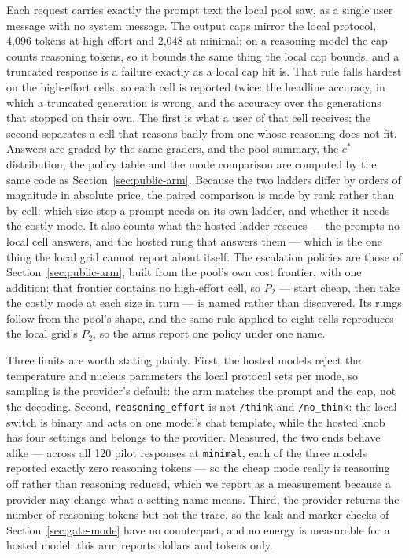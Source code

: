 Each request carries exactly the prompt text the local pool saw, as a single
user message with no system message. The output caps mirror the local
protocol, 4{,}096 tokens at high effort and 2{,}048 at minimal; on a
reasoning model the cap counts reasoning tokens, so it bounds the same thing
the local cap bounds, and a truncated response is a failure exactly as a
local cap hit is. That rule falls hardest on the high-effort cells, so each
cell is reported twice: the headline accuracy, in which a truncated
generation is wrong, and the accuracy over the generations that stopped on
their own. The first is what a user of that cell receives; the second
separates a cell that reasons badly from one whose reasoning does not fit.
Answers are graded by the same graders, and the pool summary, the $c^*$
distribution, the policy table and the mode comparison are computed by the
same code as Section~\ref{sec:public-arm}. Because the two ladders differ by
orders of magnitude in absolute price, the paired comparison is made by rank
rather than by cell: which size step a prompt needs on its own ladder, and
whether it needs the costly mode. It also counts what the hosted ladder
rescues --- the prompts no local cell answers, and the hosted rung that
answers them --- which is the one thing the local grid cannot report about
itself.
The escalation policies are those of Section~\ref{sec:public-arm}, built
from the pool's own cost frontier, with one addition: that frontier contains
no high-effort cell, so $P_2$ --- start cheap, then take the costly mode at
each size in turn --- is named rather than discovered. Its rungs follow from
the pool's shape, and the same rule applied to eight cells reproduces the
local grid's $P_2$, so the arms report one policy under one name.

Three limits are worth stating plainly. First, the hosted models reject the
temperature and nucleus parameters the local protocol sets per mode, so
sampling is the provider's default: the arm matches the prompt and the cap,
not the decoding. Second, \texttt{reasoning\_effort} is not
\texttt{/think} and \texttt{/no\_think}: the local switch is binary and acts
on one model's chat template, while the hosted knob has four settings and
belongs to the provider. Measured, the two ends behave alike --- across all
120 pilot responses at \texttt{minimal}, each of the three models reported
exactly zero reasoning tokens --- so the cheap mode really is reasoning off
rather than reasoning reduced, which we report as a measurement because a
provider may change what a setting name means. Third,
the provider returns the number of reasoning tokens but not the trace, so
the leak and marker checks of Section~\ref{sec:gate-mode} have no counterpart,
and no energy is measurable for a hosted model: this arm reports dollars and
tokens only.

